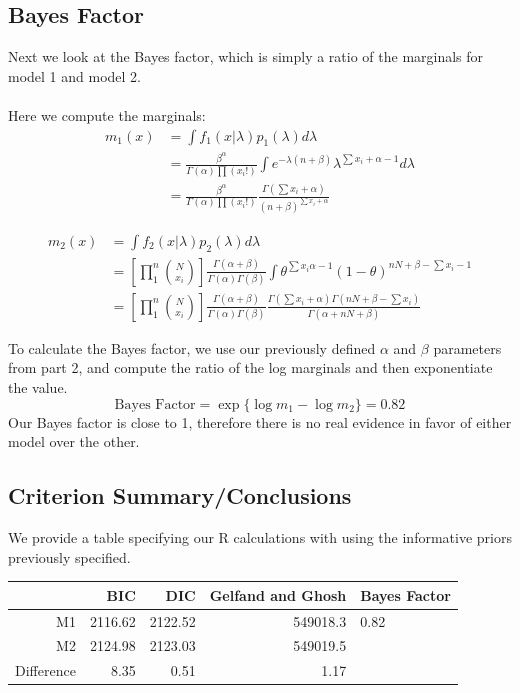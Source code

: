 \documentclass[a4paper, 9pt]{article}
\begin{document}
\begin{enumerate}
\subsection*{Bayes Factor}
Next we look at the Bayes factor, which is simply a ratio of the marginals for model 1 and model 2.
\\
\\
Here we compute the marginals:
\begin{align}
m_1(x) &= \int f_1(x|\lambda) p_1(\lambda)d\lambda\\
&= \frac{\beta^\alpha}{\Gamma(\alpha) \prod (x_i!)} \int e^{-\lambda(n + \beta)} \lambda^{\sum x_i + \alpha - 1}d\lambda\\
&= \frac{\beta^\alpha}{\Gamma(\alpha) \prod (x_i!)} \frac{\Gamma(\sum x_i + \alpha)}{(n + \beta)^{\sum x_i + \alpha}}
\end{align}

\begin{align}
    m_2(x) &= \int f_2(x|\lambda) p_2(\lambda)d\lambda\\
    &=\left[ \prod_1^{n} {{N}\choose{x_i}}\right]\frac{\Gamma(\alpha + \beta)}{\Gamma(\alpha)\Gamma(\beta)} \int \theta^{\sum x_i  \alpha - 1} (1-\theta)^{nN + \beta - \sum x_i -  1}\\
    &=\left[ \prod_1^{n} {{N}\choose{x_i}}\right]\frac{\Gamma(\alpha + \beta)}{\Gamma(\alpha)\Gamma(\beta)} \frac{\Gamma(\sum x_i + \alpha) \Gamma(nN + \beta - \sum x_i)}{\Gamma(\alpha +nN + \beta)}
\end{align}

To calculate the Bayes factor, we use our previously defined $\alpha$ and $\beta$ parameters from part 2, and compute the ratio of the log marginals and then exponentiate the value.
$$\text{Bayes Factor} = \exp\{\log m_1 - \log m_2\} = 0.82 $$
Our Bayes factor is close to 1, therefore there is no real evidence in favor of either model over the other.

\subsection*{Criterion Summary/Conclusions}

We provide a table specifying our R calculations with using the informative priors previously specified.


\begin{table}[h!]
\centering
\begin{tabular}{rrrrl}
  \hline
 & BIC & DIC & Gelfand and Ghosh & Bayes Factor \\ 
  \hline
M1 & 2116.62 & 2122.52 & 549018.3 & 0.82 \\ 
  M2 & 2124.98 & 2123.03 & 549019.5 &          \\ 
  Difference & 8.35 & 0.51 & 1.17 &          \\ 
   \hline
\end{tabular}
\end{table}

\end{enumerate}
\end{document}
